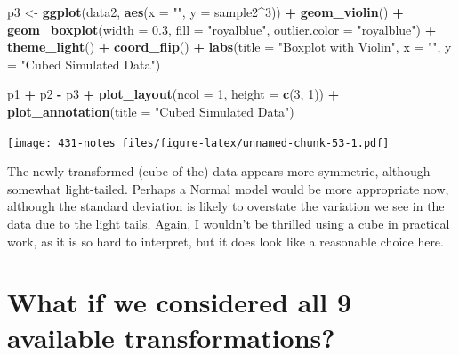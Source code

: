 \documentclass[
]{book}
\newenvironment{Shaded}{\begin{snugshade}}{\end{snugshade}}
\newcommand{\DataTypeTok}[1]{\textcolor[rgb]{0.13,0.29,0.53}{#1}}
\newcommand{\DecValTok}[1]{\textcolor[rgb]{0.00,0.00,0.81}{#1}}
\newcommand{\FloatTok}[1]{\textcolor[rgb]{0.00,0.00,0.81}{#1}}
\newcommand{\KeywordTok}[1]{\textcolor[rgb]{0.13,0.29,0.53}{\textbf{#1}}}
\newcommand{\NormalTok}[1]{#1}
\newcommand{\OperatorTok}[1]{\textcolor[rgb]{0.81,0.36,0.00}{\textbf{#1}}}
\newcommand{\StringTok}[1]{\textcolor[rgb]{0.31,0.60,0.02}{#1}}
\begin{document}
\begin{Shaded}
\begin{Highlighting}[]
\NormalTok{p3 <-}\StringTok{ }\KeywordTok{ggplot}\NormalTok{(data2, }\KeywordTok{aes}\NormalTok{(}\DataTypeTok{x =} \StringTok{""}\NormalTok{, }\DataTypeTok{y =}\NormalTok{ sample2}\OperatorTok{^}\DecValTok{3}\NormalTok{)) }\OperatorTok{+}
\StringTok{    }\KeywordTok{geom_violin}\NormalTok{() }\OperatorTok{+}
\StringTok{    }\KeywordTok{geom_boxplot}\NormalTok{(}\DataTypeTok{width =} \FloatTok{0.3}\NormalTok{, }\DataTypeTok{fill =} \StringTok{"royalblue"}\NormalTok{, }
                 \DataTypeTok{outlier.color =} \StringTok{"royalblue"}\NormalTok{) }\OperatorTok{+}
\StringTok{    }\KeywordTok{theme_light}\NormalTok{() }\OperatorTok{+}
\StringTok{    }\KeywordTok{coord_flip}\NormalTok{() }\OperatorTok{+}
\StringTok{    }\KeywordTok{labs}\NormalTok{(}\DataTypeTok{title =} \StringTok{"Boxplot with Violin"}\NormalTok{,}
         \DataTypeTok{x =} \StringTok{""}\NormalTok{, }\DataTypeTok{y =} \StringTok{"Cubed Simulated Data"}\NormalTok{)}

\NormalTok{p1 }\OperatorTok{+}\StringTok{ }\NormalTok{p2 }\OperatorTok{-}\StringTok{ }\NormalTok{p3 }\OperatorTok{+}\StringTok{ }\KeywordTok{plot_layout}\NormalTok{(}\DataTypeTok{ncol =} \DecValTok{1}\NormalTok{, }\DataTypeTok{height =} \KeywordTok{c}\NormalTok{(}\DecValTok{3}\NormalTok{, }\DecValTok{1}\NormalTok{)) }\OperatorTok{+}
\StringTok{    }\KeywordTok{plot_annotation}\NormalTok{(}\DataTypeTok{title =} \StringTok{"Cubed Simulated Data"}\NormalTok{)}
\end{Highlighting}
\end{Shaded}

\texttt{[image: 431-notes\_files/figure-latex/unnamed-chunk-53-1.pdf]}

The newly transformed (cube of the) data appears more symmetric, although somewhat light-tailed. Perhaps a Normal model would be more appropriate now, although the standard deviation is likely to overstate the variation we see in the data due to the light tails. Again, I wouldn't be thrilled using a cube in practical work, as it is so hard to interpret, but it does look like a reasonable choice here.

\hypertarget{what-if-we-considered-all-9-available-transformations-1}{%
\section{What if we considered all 9 available transformations?}\label{what-if-we-considered-all-9-available-transformations-1}}
\end{document}
